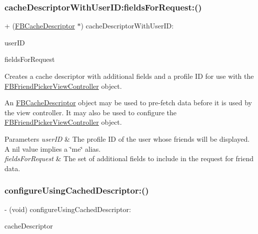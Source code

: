 \subsubsection{\texorpdfstring{cache\+Descriptor\+With\+User\+I\+D\+:fields\+For\+Request\+:()}{cacheDescriptorWithUserID:fieldsForRequest:()}\hspace{0.1cm}{\footnotesize\ttfamily [5/5]}}
{\footnotesize\ttfamily + (\hyperlink{interfaceFBCacheDescriptor}{F\+B\+Cache\+Descriptor} $\ast$) cache\+Descriptor\+With\+User\+I\+D\+: \begin{DoxyParamCaption}\item[{(N\+S\+String $\ast$)}]{user\+ID }\item[{fieldsForRequest:(N\+S\+Set $\ast$)}]{fields\+For\+Request }\end{DoxyParamCaption}}

Creates a cache descriptor with additional fields and a profile ID for use with the {\ttfamily \hyperlink{interfaceFBFriendPickerViewController}{F\+B\+Friend\+Picker\+View\+Controller}} object.

An {\ttfamily \hyperlink{interfaceFBCacheDescriptor}{F\+B\+Cache\+Descriptor}} object may be used to pre-\/fetch data before it is used by the view controller. It may also be used to configure the {\ttfamily \hyperlink{interfaceFBFriendPickerViewController}{F\+B\+Friend\+Picker\+View\+Controller}} object.


\begin{DoxyParams}{Parameters}
{\em user\+ID} & The profile ID of the user whose friends will be displayed. A nil value implies a \char`\"{}me\char`\"{} alias. \\
\hline
{\em fields\+For\+Request} & The set of additional fields to include in the request for friend data. \\
\hline
\end{DoxyParams}
\mbox{\label{interfaceFBFriendPickerViewController_aec8ccc14e83ba67dfebf0ffcc09253f8}} 
\subsubsection{\texorpdfstring{configure\+Using\+Cached\+Descriptor\+:()}{configureUsingCachedDescriptor:()}\hspace{0.1cm}{\footnotesize\ttfamily [1/5]}}
{\footnotesize\ttfamily -\/ (void) configure\+Using\+Cached\+Descriptor\+: \begin{DoxyParamCaption}\item[{(\hyperlink{interfaceFBCacheDescriptor}{F\+B\+Cache\+Descriptor} $\ast$)}]{cache\+Descriptor }\end{DoxyParamCaption}}

